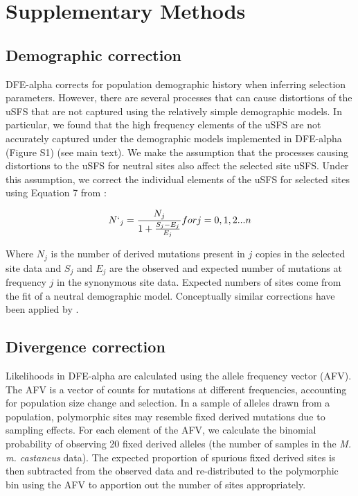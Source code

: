 \section{Supplementary Methods}
\subsection{Demographic correction}

DFE-alpha corrects for population demographic history when inferring selection parameters. However, there are several processes that can cause distortions of the uSFS that are not captured using the relatively simple demographic models. In particular, we found that the high frequency elements of the uSFS are not accurately captured under the demographic models implemented in DFE-alpha (Figure S1) (see main text). We make the assumption that the processes causing distortions to the uSFS for neutral sites also affect the selected site uSFS. Under this assumption, we correct the individual elements of the uSFS for selected sites using Equation 7 from \cite{RN321}:

\begin{equation}
N`_j = \frac{N_j}{1 + \frac{S_j - E_j}{E_j}} for j = 0,1,2 ... n
\end{equation}

Where $N_j$ is the number of derived mutations present in $j$ copies in the selected site data and $S_j$ and $E_j$ are the observed and expected number of mutations at frequency $j$ in the synonymous site data. Expected numbers of sites come from the fit of a neutral demographic model. Conceptually similar corrections have been applied by \cite{RN354,RN276,RN275}.

\subsection{Divergence correction}

Likelihoods in DFE-alpha are calculated using the allele frequency vector (AFV). The AFV is a vector of counts for mutations at different frequencies, accounting for population size change and selection. In a sample of alleles drawn from a population, polymorphic sites may resemble fixed derived mutations due to sampling effects. For each element of the AFV, we calculate the binomial probability of observing 20 fixed derived alleles (the number of samples in the \textit{M. m. castaneus} data). The expected proportion of spurious fixed derived sites is then subtracted from the observed data and re-distributed to the polymorphic bin using the AFV to apportion out the number of sites appropriately.

